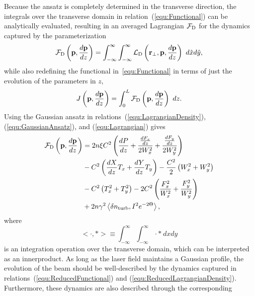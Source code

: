 \documentclass[9pt,twocolumn,twoside]{osajnl}
\newcommand\der[2]{\frac{d{#1}}{d{#2}}}
\newcommand{\bang}[1]{\Big< #1 \Big>}
\newcommand{\la}[1]{\label{#1}}
\begin{document}
Because the ansatz is completely determined in the transverse direction, the 
integrals over the transverse domain in relation~(\ref{equ:Functional}) 
can be analytically evaluated, resulting in an averaged Lagrangian $\cal{F}_{\text{D}}$ for the 
dynamics captured by the parameterization
\begin{equation}\la{equ:Lagrangian}
   {\cal F}_{\text{D}}\left(\mathbf{p},\der{\mathbf{p}}{z} \right)
  = \int_{-\infty}^{\infty} \int_{-\infty}^{\infty} {\cal L}_{\text{D}}\left( \mathbf{r}_{\perp}, \mathbf{p}, \der{\mathbf{p}}{z} \right) \ d\hat{x} d\hat{y},
\end{equation}
while also redefining the functional in~\eqref{equ:Functional} 
in terms of just the evolution of the parameters in $z$,
\begin{equation}\la{equ:ReducedFunctional}
  J\left( \mathbf{p}, \der{\mathbf{p}}{z} \right) = \int_{0}^{L} {\cal F}_{\text{D}}\left( \mathbf{p},\der{\mathbf{p}}{z} \right) \ dz.
\end{equation}
Using the Gaussian ansatz in relations~(\ref{equ:LagrangianDensity}), (\ref{equ:GaussianAnsatz}), and 
(\ref{equ:Lagrangian}) gives 
\begin{equation}\la{equ:ReducedLagrangianDensity}
 \begin{aligned}
  {\cal F}_{\text{D}}\left( {\bf p},\der{\bf p}{z} \right) & = 2n \xi C^2 \left(\der{P}{z} + \frac{\der{F_{x}}{z} }{2W_{x}^{2}} + \frac{\der{F_{y}}{z}}{2W_{y}^{2}} \right) \\
  &- C^{2} \left( \der{X}{z} T_{x} + \der{Y}{z} T_{y} \right) - \frac{C^2}{2} \left( W_{x}^{2} + W_{y}^{2} \right)\\
  &- C^{2} \left( T_{x}^{2} + T_{y}^{2} \right) - 2 C^{2} \left( \frac{F_{x}^{2}}{W_{x}^{2}} + \frac{F_{y}^{2}}{W_{y}^{2}} \right) \\
  &+  2n \gamma^2 \left< \delta n_{\text{turb}}, I^{2} e^{-2\Theta} \right>,
 \end{aligned}
\end{equation}
where 
\[
\bang{\cdot, *} \equiv \int_{-\infty}^{\infty} \int_{-\infty}^{\infty} \cdot * \ dxdy
\]
is an integration operation over the transverse domain, which can be 
interpreted as an innerproduct.  As long as the laser field maintains 
a Gaussian profile, the evolution of the beam should be well-described 
by the dynamics captured in relations~(\ref{equ:ReducedFunctional}) and 
(\ref{equ:ReducedLagrangianDensity}).   
Furthermore, these dynamics are also described through the corresponding 
\end{document}
